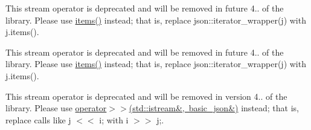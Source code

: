 
\begin{DoxyRefList}
\item[Global \mbox{\hyperlink{classnlohmann_1_1basic__json_a5e4212986136ca1220f351c60e89906b}{nlohmann\+::basic\+\_\+json$<$ Object\+Type, Array\+Type, String\+Type, Boolean\+Type, Number\+Integer\+Type, Number\+Unsigned\+Type, Number\+Float\+Type, Allocator\+Type, JSONSerializer $>$\+::iterator\+\_\+wrapper}} (reference ref) noexcept]\label{deprecated__deprecated000001}%
%
This stream operator is deprecated and will be removed in future 4.. of the library. Please use \mbox{\hyperlink{classnlohmann_1_1basic__json_afe3e137ace692efa08590d8df40f58dd}{items()}} instead; that is, replace {\ttfamily json\+::iterator\+\_\+wrapper(j)} with {\ttfamily j.\+items()}. 

\label{deprecated__deprecated000004}%
%
This stream operator is deprecated and will be removed in future 4.. of the library. Please use \mbox{\hyperlink{classnlohmann_1_1basic__json_afe3e137ace692efa08590d8df40f58dd}{items()}} instead; that is, replace {\ttfamily json\+::iterator\+\_\+wrapper(j)} with {\ttfamily j.\+items()}.  
\item[Global \mbox{\hyperlink{classnlohmann_1_1basic__json_a60ca396028b8d9714c6e10efbf475af6}{nlohmann\+::basic\+\_\+json$<$ Object\+Type, Array\+Type, String\+Type, Boolean\+Type, Number\+Integer\+Type, Number\+Unsigned\+Type, Number\+Float\+Type, Allocator\+Type, JSONSerializer $>$\+::operator$<$$<$}} (\mbox{\hyperlink{classnlohmann_1_1basic__json}{basic\+\_\+json}} \&j, std\+::istream \&i)]\label{deprecated__deprecated000003}%
%
This stream operator is deprecated and will be removed in version 4.. of the library. Please use \mbox{\hyperlink{classnlohmann_1_1basic__json_aaf363408931d76472ded14017e59c9e8}{operator$>$$>$(std\+::istream\&, basic\+\_\+json\&)}} instead; that is, replace calls like {\ttfamily j $<$$<$ i;} with {\ttfamily i $>$$>$ j;}. 


\end{DoxyRefList}

